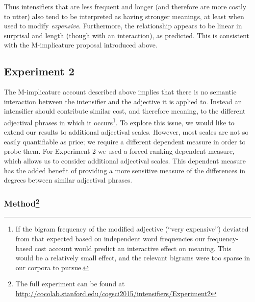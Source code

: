 \documentclass[10pt,letterpaper]{article}
\begin{document}


Thus intensifiers that are less frequent and longer (and therefore are more costly to utter) also tend to be interpreted as having stronger meanings, at least when used to modify \emph{expensive}. Furthermore, the relationship appears to be linear in surprisal and length (though with an interaction), as predicted.
This is consistent with the M-implicature proposal introduced above.

\subsection{Experiment 2}

The M-implicature account described above implies that there is no semantic interaction between the intensifier and the adjective it is applied to. Instead an intensifier should contribute similar cost, and therefore meaning, to the different adjectival phrases in which it occurs\footnote{If the bigram frequency of the modified adjective (``very expensive'') deviated from that expected based on independent word frequencies our frequency-based cost account would predict an interactive effect on meaning. This would be a relatively small effect, and the relevant bigrams were too sparse in our corpora to pursue.}.
To explore this issue, we would like to extend our results to additional adjectival scales. However, most scales are not so easily quantifiable as price; we require a different dependent measure in order to probe them.
For Experiment 2 we used a forced-ranking dependent measure, which allows us to consider additional adjectival scales. This dependent measure has the added benefit of providing a more sensitive measure of the differences in degrees between similar adjectival phrases.

\subsubsection{Method\footnote{The full experiment can be found at \url{http://cocolab.stanford.edu/cogsci2015/intensifiers/Experiment2}}}
\end{document}
